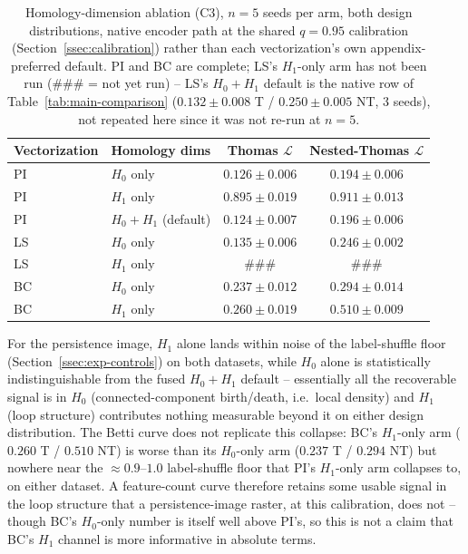 \documentclass[11pt,letterpaper]{article}
\newcommand{\1}{\mathds{1}}
\theoremstyle{plain}
\theoremstyle{definitioncolon}
\begin{document}
\begin{table}[tbp]
\centering
\small
\begin{tabular}{llcc}
\toprule
Vectorization & Homology dims & Thomas $\mathcal{L}$ & Nested-Thomas $\mathcal{L}$ \\
\midrule
PI & $H_0$ only     & $0.126 \pm 0.006$ & $0.194 \pm 0.006$ \\
PI & $H_1$ only     & $0.895 \pm 0.019$ & $0.911 \pm 0.013$ \\
PI & $H_0{+}H_1$ (default) & $0.124 \pm 0.007$ & $0.196 \pm 0.006$ \\
\addlinespace
LS & $H_0$ only     & $0.135 \pm 0.006$ & $0.246 \pm 0.002$ \\
LS & $H_1$ only     & \#\#\# & \#\#\# \\
\addlinespace
BC & $H_0$ only     & $0.237 \pm 0.012$ & $0.294 \pm 0.014$ \\
BC & $H_1$ only     & $0.260 \pm 0.019$ & $0.510 \pm 0.009$ \\
\bottomrule
\end{tabular}
\caption{Homology-dimension ablation (C3), $n=5$ seeds per arm, both design
distributions, native encoder path at the shared $q=0.95$ calibration
(Section~\ref{ssec:calibration}) rather than each vectorization's own
appendix-preferred default. PI and BC are complete;
LS's $H_1$-only arm has not been run (\#\#\# = not yet run) -- LS's
$H_0{+}H_1$ default is the native row of Table~\ref{tab:main-comparison}
($0.132\pm0.008$ T / $0.250\pm0.005$ NT, 3 seeds), not repeated here since it
was not re-run at $n=5$.}
\label{tab:homology-ablation}
\end{table}
For the persistence image, $H_1$ alone lands within noise of the
label-shuffle floor (Section~\ref{ssec:exp-controls}) on both datasets,
while $H_0$ alone is statistically indistinguishable from the fused
$H_0{+}H_1$ default -- essentially all the recoverable signal is in $H_0$
(connected-component birth/death, i.e.\ local density) and $H_1$ (loop
structure) contributes nothing measurable beyond it on either design
distribution. The Betti curve does not replicate this collapse: BC's
$H_1$-only arm ($0.260$ T / $0.510$ NT) is worse than its $H_0$-only arm
($0.237$ T / $0.294$ NT) but nowhere near the $\approx\!0.9$--$1.0$
label-shuffle floor that PI's $H_1$-only arm collapses to, on either
dataset. A feature-count curve therefore retains some usable signal in the
loop structure that a persistence-image raster, at this calibration, does
not -- though BC's $H_0$-only number is itself well above PI's, so this is
not a claim that BC's $H_1$ channel is more informative in absolute terms.
\end{document}
